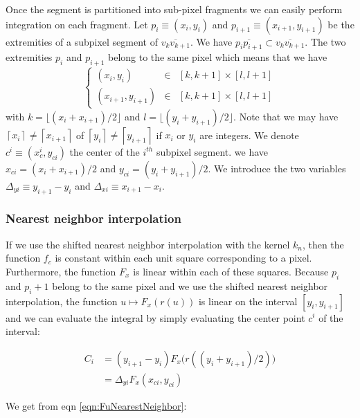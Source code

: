 \documentclass[11pt]{article}
\begin{document}
Once the segment is partitioned into sub-pixel fragments we can easily perform integration on each fragment.
Let $p_i\equiv(x_i,y_i)$ and $p_{i+1}\equiv(x_{i+1},y_{i+1})$ be the extremities of a subpixel segment of $\overline{v_k v_{k+1}}$. We have $\overline{p_i p_{i+1}}\subset \overline{v_kv_{k+1}}$. The two extremities $p_i$ and $p_{i+1}$ belong to the same pixel which means that we have 
\begin{equation}
\left\{
\begin{array}{lcl}
(x_i,y_i) &\in& [k,k+1]\times [l,l+1]\\  
(x_{i+1},y_{i+1})& \in &[k,k+1]\times [l,l+1]
\end{array}
\right.
\end{equation}
with $k=\lfloor(x_i+x_{i+1})/2\rfloor$ and $l=\lfloor(y_i+y_{i+1})/2\rfloor$.
Note that we may have $\left\lceil x_i\right\rceil\neq\left\lceil x_{i+1}\right\rceil$ of $\left\lceil y_i\right\rceil \neq \left\lceil y_{i+1}\right\rceil$ if $x_i$ or $y_i$ are integers.
We denote $c^i\equiv(x_c^i,y_{ci})$ the center of the $i^{th}$ subpixel segment. we have $x_{ci}=(x_i+x_{i+1})/2$ and   $y_{ci}=(y_i+y_{i+1})/2$. We introduce the two variables $\Delta_{yi} \equiv y_{i+1}-y_{i}$ and $\Delta_{xi} \equiv x_{i+1}-x_{i}$. 

\subsubsection{Nearest neighbor interpolation}
\label{sec:nn_interpolated2Dintegral}

If we use the shifted nearest neighbor interpolation with the kernel $k_n$, then the function $f_c$ is constant within each unit square corresponding to a pixel. Furthermore, the function $F_x$ is linear within each of these squares.
Because $p_i$ and $p_i+1$ belong to the same pixel and we use the shifted nearest neighbor interpolation, the function $u\mapsto F_x(r(u))$ is linear on the interval $[y_i,y_{i+1}]$ and we can evaluate the integral by simply evaluating  the center point $c^i$ of the interval:

\begin{equation} 
\begin{split}
C_i&=(y_{i+1}-y_i)F_x\big(r((y_i+y_{i+1})/2)\big)\\&=
\Delta_{yi} F_x(x_{ci},y_{ci})
\end{split}
\end{equation}

We get from eqn \ref{eqn:FuNearestNeighbor}: 
\end{document}
